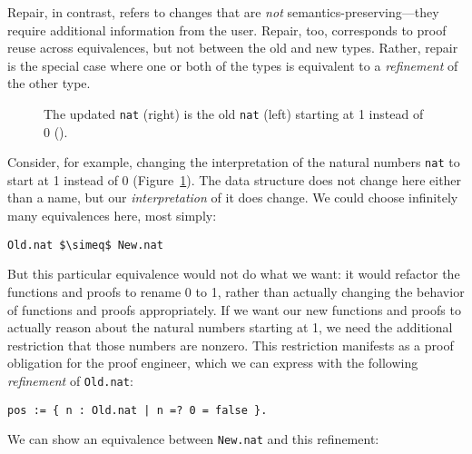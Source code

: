 Repair, in contrast, refers to changes that are \textit{not} semantics-preserving---they require additional information
from the user.
Repair, too, corresponds to proof reuse across equivalences, but not between the old and new types.
Rather, repair is the special case where one or both of the types is equivalent to a \textit{refinement}
of the other type.

\begin{figure}
\begin{minipage}{0.46\textwidth}
   
\end{minipage}
\hfill
\begin{minipage}{0.46\textwidth}
   
\end{minipage}
\caption{The updated \lstinline{nat} (right) is the old \lstinline{nat} (left) starting at 1 instead of 0 ().}
\label{fig:natrepair}
\end{figure}

Consider, for example, changing the interpretation of the natural numbers \lstinline{nat} to start at 1 instead of 0 (Figure~\ref{fig:natrepair}).
The data structure does not change here either than a name, but our \textit{interpretation} of it does change.
We could choose infinitely many equivalences here, most simply:

\begin{lstlisting}
Old.nat $\simeq$ New.nat
\end{lstlisting}
But this particular equivalence would not do what we want: it would refactor the functions and proofs to rename 0 to 1, rather than
actually changing the behavior of functions and proofs appropriately.
If we want our new functions and proofs to actually reason about the natural numbers starting at 1,
we need the additional restriction that those numbers are nonzero. 
This restriction manifests as a proof obligation for the proof engineer, which we can express
with the following \textit{refinement} of \lstinline{Old.nat}:

\begin{lstlisting}
pos := { n : Old.nat | n =? 0 = false }.
\end{lstlisting}

We can show an equivalence between \lstinline{New.nat} and this refinement:

